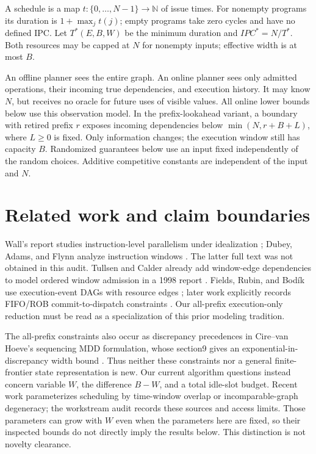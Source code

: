 \documentclass[11pt]{article}
\newcommand{\T}{T^*}
\begin{document}
A schedule is a map $t:\{0,\ldots,N-1\}\to\mathbb N$ of issue times.
For nonempty programs its duration is $1+\max_j t(j)$; empty programs take
zero cycles and have no defined IPC. Let $\T(E,B,W)$ be the minimum duration
and $IPC^*=N/\T$. Both resources may be capped at $N$ for nonempty inputs;
effective width is at most $B$.

An offline planner sees the entire graph. An online planner sees only
admitted operations, their incoming true dependencies, and execution history.
It may know $N$, but receives no oracle for future uses of visible values.
All online lower bounds below use this observation model.
In the prefix-lookahead variant, a boundary with retired prefix $r$ exposes
incoming dependencies below $\min(N,r+B+L)$, where $L\ge0$ is fixed.
Only information changes; the execution window still has capacity $B$.
Randomized guarantees below use an input fixed independently of the random
choices. Additive competitive constants are independent of the input and $N$.

\section{Related work and claim boundaries}
Wall's report studies instruction-level parallelism under idealization
\cite{wall}; Dubey, Adams, and Flynn analyze instruction windows
\cite{dubey}. The latter full text was not obtained in this audit.
Tullsen and Calder already add window-edge dependencies to model ordered
window admission in a 1998 report \cite{tullsen}.
Fields, Rubin, and Bod\'ik use execution-event DAGs with resource edges
\cite{fields}; later work explicitly records FIFO/ROB commit-to-dispatch
constraints \cite{navada}. Our all-prefix execution-only reduction must be
read as a specialization of this prior modeling tradition.

The all-prefix constraints also occur as discrepancy precedences in
Cire--van Hoeve's sequencing MDD formulation, whose section9 gives an
exponential-in-discrepancy width bound \cite{cire}. Thus neither these
constraints nor a general finite-frontier state representation is new.
Our current algorithm questions instead concern variable $W$, the difference
$B-W$, and a total idle-slot budget. Recent work parameterizes scheduling by
time-window overlap or incomparable-graph degeneracy; the workstream audit
records these sources and access limits. Those parameters can grow with $W$
even when the parameters here are fixed, so their inspected bounds do not
directly imply the results below. This distinction is not novelty clearance.
\end{document}
